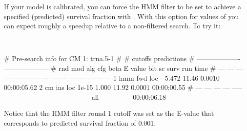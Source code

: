 If your model is calibrated, you can force the HMM filter to be set to
achieve a specified (predicted) survival fraction with
. With this option for values of 
you can expect roughly a  speedup relative to a
non-filtered search. To try it: 

\\

\begin{sreoutput}
# Pre-search info for CM 1: trna.5-1
#
#                                  cutoffs            predictions     
#                            -------------------  --------------------
# rnd  mod  alg  cfg   beta     E value   bit sc     surv     run time
# ---  ---  ---  ---  -----  ----------  -------  -------  -----------
    1  hmm  fwd  loc      -       5.472    11.46   0.0010  00:00:05.62
    2   cm  ins  loc  1e-15       1.000    11.92   0.0001  00:00:00.55
# ---  ---  ---  ---  -----  ----------  -------  -------  -----------
  all    -    -    -      -           -        -        -  00:00:06.18
\end{sreoutput}
\begin{comment}
# Post-search info for CM 1: trna.5-1
#
#                              number of hits       surv fraction  
#                            -------------------  -----------------
# rnd  mod  alg  cfg   beta    expected   actual  expected   actual
# ---  ---  ---  ---  -----  ----------  -------  --------  -------
    1  hmm  fwd  loc      -       5.472        3    0.0010   0.0005
    2   cm  ins  loc  1e-15       1.000        1    0.0001   0.0001
#
# expected time    actual time
# -------------  -------------
    00:00:06.18    00:00:06.00
\end{comment}

Notice that the HMM filter round 1 cutoff was set as the E-value 
that corresponds to predicted survival fraction of 0.001.

